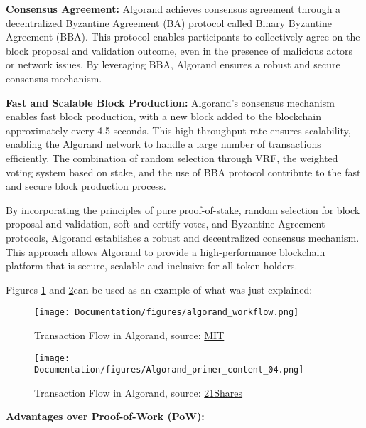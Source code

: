 \textbf{Consensus Agreement:}
Algorand achieves consensus agreement through a decentralized Byzantine Agreement (BA) protocol called Binary Byzantine Agreement (BBA). This protocol enables participants to collectively agree on the block proposal and validation outcome, even in the presence of malicious actors or network issues. By leveraging BBA, Algorand ensures a robust and secure consensus mechanism.\newline

\textbf{Fast and Scalable Block Production:}
Algorand's consensus mechanism enables fast block production, with a new block added to the blockchain approximately every 4.5 seconds. This high throughput rate ensures scalability, enabling the Algorand network to handle a large number of transactions efficiently. The combination of random selection through VRF, the weighted voting system based on stake, and the use of BBA protocol contribute to the fast and secure block production process.\newline

By incorporating the principles of pure proof-of-stake, random selection for block proposal and validation, soft and certify votes, and Byzantine Agreement protocols, Algorand establishes a robust and decentralized consensus mechanism. This approach allows Algorand to provide a high-performance blockchain platform that is secure, scalable and inclusive for all token holders.\newline

Figures \ref{fig:algo} and \ref{fig:algoflow}can be used as an example of what was just explained:\newline

\begin{figure}[htbp]
	\centering
	\texttt{[image: Documentation/figures/algorand\_workflow.png]}  %
	\caption{Transaction Flow in Algorand, source: \href{https://people.csail.mit.edu/nickolai/papers/gilad-algorand-eprint.pdf}{MIT}}
	\label{fig:algo}
\end{figure}

\begin{figure}[htbp]
	\centering
	\texttt{[image: Documentation/figures/Algorand\_primer\_content\_04.png]}  %
	\caption{Transaction Flow in Algorand, source: \href{https://21shares.com/research/algorand-research-primer}{21Shares}}
	\label{fig:algoflow}
\end{figure}

\textbf{Advantages over Proof-of-Work (PoW):}\newline

